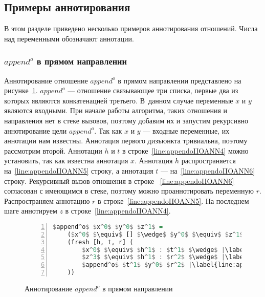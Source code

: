 \subsection{Примеры аннотирования}

В этом разделе приведено несколько примеров аннотирования отношений.
Числа над переменными обозначают аннотации.


\subsubsection{$append^o$ в прямом направлении}

Аннотирование отношение $append^o$ в прямом направлении представлено на рисунке~\ref{lst:appendoIIOANN}.
$append^o$ --- отношение связывающее три списка, первые два из которых являются конкатенацией третьего.
В~данном случае  переменные $x$ и $y$ являются входными. 
При начале работы алгоритма, таких отношения и направления нет в стеке вызовов, поэтому добавим их и запустим рекурсивно аннотирование цели $append^o$. 
Так как $x$ и $y$ --- входные переменные, их аннотации нам известны.
Аннотация первого дизъюнкта тривиальна, поэтому рассмотрим второй.
Аннотации $h$ и $t$ в строке~\ref{line:appendoIIOANN4} можно установить, так как известна аннотация $x$.
Аннотация $h$ распространяется на~\ref{line:appendoIIOANN5} строку, а аннотация $t$ --- на~\ref{line:appendoIIOANN6} строку.
Рекурсивный вызов отношения в строке ~\ref{line:appendoIIOANN6} согласован с имеющимся в стеке, поэтому можно проаннотировать переменную $r$.
Распространяем аннотацию $r$ в строке~\ref{line:appendoIIOANN5}.
На последнем шаге аннотируем $z$ в строке~\ref{line:appendoIIOANN4}.

\begin{figure}[h!]
  \begin{center}
  \begin{minipage}{0.4\textwidth}
  \begin{lstlisting}[language=Haskell, frame=single, numbers=left,numberstyle=\small, firstnumber=1, escapechar=|]
  $append^o$ $x^0$ $y^0$ $z^1$ =
    ($x^0$ $\equiv$ [] $\wedge$ $y^0$ $\equiv$ $z^1$) $\vee$ |\label{line:appendoIIOANN2}|
    (fresh [h, t, r] (
        $x^0$ $\equiv$ $h^1$ : $t^1$ $\wedge$ |\label{line:appendoIIOANN4}|
        $z^3$ $\equiv$ $h^1$ : $r^2$ $\wedge$ |\label{line:appendoIIOANN5}|
        $append^o$ $t^1$ $y^0$ $r^2$ |\label{line:appendoIIOANN6}|
    ))
    \end{lstlisting}
  \end{minipage}
  \end{center}
  \caption{Аннотирование $append^o$ в прямом направлении}
  \label{lst:appendoIIOANN}
\end{figure}

